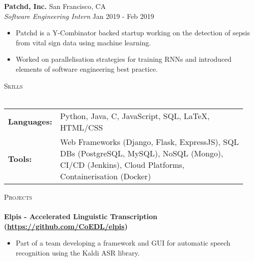 \documentclass[a4paper]{article}
\newcommand{\lineunder} {
    \vspace*{-8pt} \\
    \hspace*{-10pt} \hrulefill \\
}
\newcommand{\header} [1] {
    {\hspace*{-10pt}\vspace*{6pt} \textsc{#1}}
    \vspace*{-6pt} \lineunder
}
\newenvironment{myitemize}
{   \small
    \vspace{-2pt}
    \begin{itemize}
    \setlength{\itemsep}{0pt}
    \setlength{\parskip}{0pt}
    \setlength{\parsep}{0pt}     }
{ \end{itemize}                  }
\newenvironment{singleitem}
{   \small
    \vspace{0pt}
    \begin{itemize}
    \setlength{\itemsep}{0pt}
    \setlength{\parskip}{0pt}
    \setlength{\parsep}{0pt}   }
{\end{itemize} \vspace{1pt}	}
\begin{document}
\textbf{Patchd, Inc.} \hfill San Francisco, CA\\
\textit{Software Engineering Intern} \hfill  Jan 2019 - Feb 2019\\
\begin{myitemize} \itemsep 0.5mm
	\item Patchd is a Y-Combinator backed startup working on the detection of sepsis from vital sign data using machine learning.
	\item Worked on parallelisation strategies for training RNNs and introduced elements of software engineering best practice.
\end{myitemize}

\vspace{1mm}
\header{Skills}
\vspace{1.5mm}
\begin{tabular}{p{0.12\linewidth}p{0.83\linewidth}}
	\textbf{Languages:} & Python, Java, C, JavaScript, SQL, \LaTeX, HTML/CSS \\
	\textbf{Tools:} & Web Frameworks (Django, Flask, ExpressJS), SQL DBs (PostgreSQL, MySQL), NoSQL (Mongo), CI/CD (Jenkins), Cloud Platforms, Containerisation (Docker)
\end{tabular}

\vspace{2mm}

\header{Projects}

\textbf{{Elpis - Accelerated Linguistic Transcription} (\href{https://github.com/CoEDL/elpis}{https://github.com/CoEDL/elpis})}
\begin{singleitem}
	\item Part of a team developing a framework and GUI for automatic speech recognition using the Kaldi ASR library.
\end{singleitem}
\end{document}
